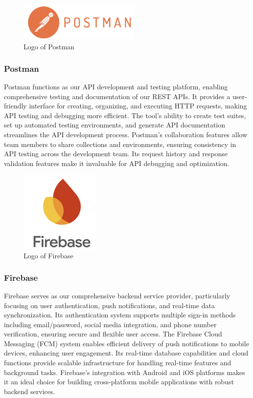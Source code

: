 \documentclass[conference]{IEEEtran}
\begin{document}
        \begin{figure}[htbp]
            \centerline{\includegraphics[width=6cm, height=2cm]{Images/logo/postman.png}}
            \caption{Logo of Postman}
            \label{fig}
        \end{figure}
        \subsubsection{Postman}
            Postman functions as our API development and testing platform, enabling comprehensive testing and documentation of our REST APIs. It provides a user-friendly interface for creating, organizing, and executing HTTP requests, making API testing and debugging more efficient. The tool's ability to create test suites, set up automated testing environments, and generate API documentation streamlines the API development process. Postman's collaboration features allow team members to share collections and environments, ensuring consistency in API testing across the development team. Its request history and response validation features make it invaluable for API debugging and optimization.
            
        \begin{figure}[htbp]
            \centerline{\includegraphics[width=4cm, height=4cm]{Images/logo/firebase.png}}
            \caption{Logo of Firebase}
            \label{fig}
        \end{figure}
        \subsubsection{Firebase}
            Firebase serves as our comprehensive backend service provider, particularly focusing on user authentication, push notifications, and real-time data synchronization. Its authentication system supports multiple sign-in methods including email/password, social media integration, and phone number verification, ensuring secure and flexible user access. The Firebase Cloud Messaging (FCM) system enables efficient delivery of push notifications to mobile devices, enhancing user engagement. Its real-time database capabilities and cloud functions provide scalable infrastructure for handling real-time features and background tasks. Firebase's integration with Android and iOS platforms makes it an ideal choice for building cross-platform mobile applications with robust backend services.
\end{document}
